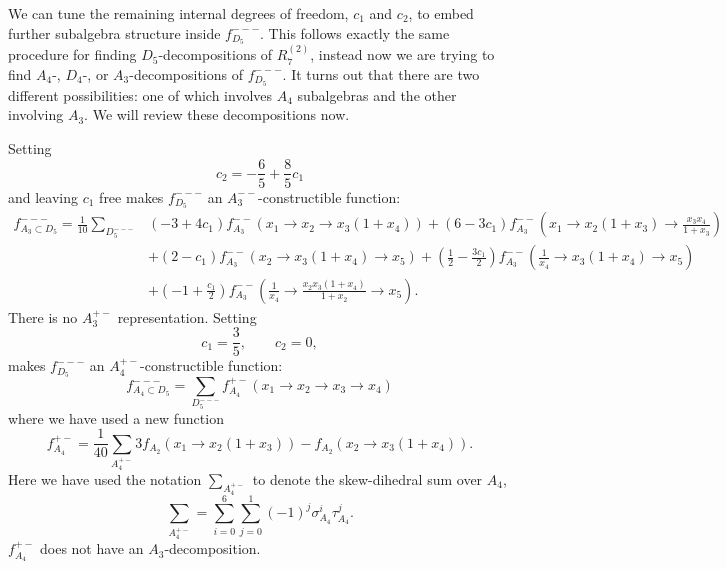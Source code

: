 \documentclass[11pt]{article}
\def\nl{\nonumber\\}
\begin{document}
We can tune the remaining internal degrees of freedom, $c_1$ and $c_2$, to embed further subalgebra structure inside $f_{D_5}^{---}$. This follows exactly the same procedure for finding $D_5$-decompositions of $R^{(2)}_7$, instead now we are trying to find $A_4$-, $D_4$-, or $A_3$-decompositions of $f_{D_5}^{---}$. It turns out that there are two different possibilities: one of which involves $A_4$ subalgebras and the other involving $A_3$. We will review these decompositions now.

Setting 
\begin{equation}
	c_2 = -\frac{6}{5} + \frac{8}{5} c_1
\end{equation}
and leaving $c_1$ free makes $f_{D_5}^{---}$ an $A_3^{--}$-constructible function:
\begin{align}
	f_{A_3\subset D_5}^{---} = \frac{1}{10}\sum_{D_5^{---}}
	&\left(-3+4 c_1\right) f_{A_3}^{--}\left(x_1\to x_2\to x_3 \left(1+x_4\right)\right)
	+\left(6-3 c_1\right) f_{A_3}^{--}\left(x_1\to x_2 \left(1+x_3\right)\to \frac{x_3 x_4}{1+x_3}\right) \nl
	&+\left(2-c_1\right) f_{A_3}^{--}\left(x_2\to x_3 \left(1+x_4\right)\to x_5\right)+\left(\frac{1}{2}
	-\frac{3 c_1}{2}\right) f_{A_3}^{--}\left(\frac{1}{x_4}\to x_3 \left(1+x_4\right)\to x_5\right) \nl
	&+\left(-1+\frac{c_1}{2}\right) f_{A_3}^{--}\left(\frac{1}{x_4}\to \frac{x_2 x_3 \left(1+x_4\right)}{1+x_2}\to x_5\right).
\end{align}
There is no $A_3^{+-}$ representation. Setting 
\begin{equation}
	c_1 = \frac{3}{5}, \qquad c_2 = 0,
\end{equation}
makes $f_{D_5}^{---}$ an $A_4^{+-}$-constructible function:
\begin{equation}
	f_{A_4\subset D_5}^{---} = \sum_{D_5^{---}} f_{A_4}^{+-}(x_1\to x_2\to x_3 \to x_4)
\end{equation}
where we have used a new function
\begin{equation}\label{eq:fa4-def}
	f_{A_4}^{+-} = \frac{1}{40}\sum_{A_4^{+-}}3f_{A_2}(x_1 \to x_2(1+x_3)) - f_{A_2}(x_2\to x_3(1+x_4)).
\end{equation}
Here we have used the notation $\sum_{A_4^{+-}}$ to denote the skew-dihedral sum over $A_4$, 
\begin{equation}
 	\sum_{A_4^{+-}} = \sum_{i=0}^6\sum_{j=0}^1(-1)^j \sigma_{A_4}^i \tau_{A_4}^j.
\end{equation} 
$f_{A_4}^{+-}$ does not have an $A_3$-decomposition. 
\end{document}
